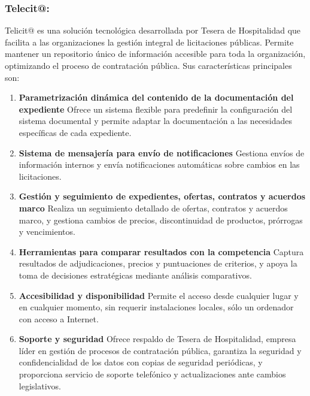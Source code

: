 \documentclass{article}
\begin{document}
  \subsubsection{Telecit@:} 
  Telicit@ es una solución tecnológica desarrollada por Tesera de Hospitalidad que facilita a las organizaciones la gestión integral de licitaciones públicas. Permite mantener un repositorio único de información accesible para toda la organización, optimizando el proceso de contratación pública. 
  Sus características principales son: 
\begin{enumerate}
    \item \textbf{Parametrización dinámica del contenido de la documentación del expediente}  
    \newline
    Ofrece un sistema flexible para predefinir la configuración del sistema documental y permite adaptar la documentación a las necesidades específicas de cada expediente.
    
    \item \textbf{Sistema de mensajería para envío de notificaciones}  
    \newline
    Gestiona envíos de información internos y envía notificaciones automáticas sobre cambios en las licitaciones.
    
    \item \textbf{Gestión y seguimiento de expedientes, ofertas, contratos y acuerdos marco}  
    \newline
    Realiza un seguimiento detallado de ofertas, contratos y acuerdos marco, y gestiona cambios de precios, discontinuidad de productos, prórrogas y vencimientos.
    
    \item \textbf{Herramientas para comparar resultados con la competencia}  
    \newline
    Captura resultados de adjudicaciones, precios y puntuaciones de criterios, y apoya la toma de decisiones estratégicas mediante análisis comparativos.
    
    \item \textbf{Accesibilidad y disponibilidad}  
    \newline
    Permite el acceso desde cualquier lugar y en cualquier momento, sin requerir instalaciones locales, sólo un ordenador con acceso a Internet.
    
    \item \textbf{Soporte y seguridad}  
    \newline
    Ofrece respaldo de Tesera de Hospitalidad, empresa líder en gestión de procesos de contratación pública, garantiza la seguridad y confidencialidad de los datos con copias de seguridad periódicas, y proporciona servicio de soporte telefónico y actualizaciones ante cambios legislativos.
\end{enumerate}
\end{document}
